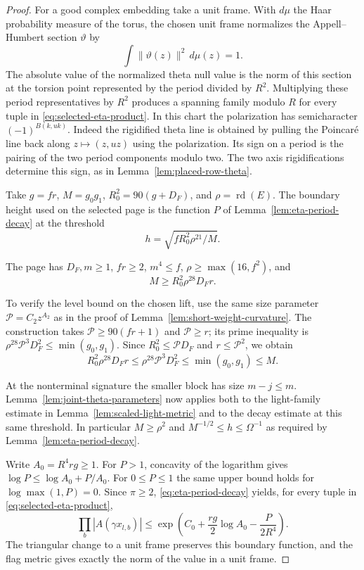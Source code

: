 \begin{proof}
For a good complex embedding take a unit frame. With \(d\mu\) the Haar probability measure of the torus, the chosen unit frame normalizes the Appell--Humbert section \(\vartheta\) by
\[
  \int\|\vartheta(z)\|^2\,d\mu(z)=1.
\]
The absolute value of the normalized theta null value is the norm
of this section at the torsion point represented by the period
divided by \(R^2\). Multiplying these period representatives
by \(R^2\) produces a spanning family modulo \(R\) for every
tuple in \eqref{eq:selected-eta-product}. In this chart the
polarization has semicharacter \((-1)^{B(k,uk)}\). Indeed the
rigidified theta line is obtained by pulling the Poincar\'e line
back along \(z\mapsto(z,uz)\) using the polarization. Its sign
on a period is the pairing of the two period components modulo two.
The two axis rigidifications determine this sign, as in
Lemma~\ref{lem:placed-row-theta}.

Take \(g=fr\), \(M=g_0g_1\), \(R_0^2=90(g+D_F)\), and
\(\rho=\operatorname{rd}(E)\). The boundary height used on the
selected page is the function \(P\) of Lemma~\ref{lem:eta-period-decay}
at the threshold
\[
 h=\sqrt{f R_0^2\rho^{21}/M}.
\]

The page has \(D_F,m\ge1\), \(fr\ge2\), \(m^4\le f\),
\(\rho\ge\max(16,f^2)\), and
\begin{equation}\label{eq:selected-torus-level}
 M\ge R_0^2\rho^{28} D_F r .
\end{equation}

To verify the level bound on the chosen lift, use the same size
parameter \(\mathcal P=C_2z^{A_2}\) as in the proof of
Lemma~\ref{lem:short-weight-curvature}. The construction takes
\(\mathcal P\ge90(fr+1)\) and \(\mathcal P\ge r\); its prime
inequality is \(\rho^{28}\mathcal P^3 D_F^2\le\min(g_0,g_1)\).
Since \(R_0^2\le\mathcal P D_F\) and \(r\le\mathcal P^2\), we obtain
\[
 R_0^2\rho^{28}D_F r\le\rho^{28}\mathcal P^3D_F^2
                    \le\min(g_0,g_1)\le M .
\]

At the nonterminal signature the smaller block has size
\(m-j\le m\). Lemma~\ref{lem:joint-theta-parameters} now applies
both to the light-family estimate in
Lemma~\ref{lem:scaled-light-metric} and to the decay estimate at
this same threshold. In particular \(M\ge\rho^2\) and
\(M^{-1/2}\le h\le\Omega^{-1}\) as required by
Lemma~\ref{lem:eta-period-decay}.
\label{cor:selected-auxiliary-cusp-5}

Write \(A_0=R^4rg\ge1\). For \(P>1\), concavity of the logarithm
gives \(\log P\le\log A_0+P/A_0\). For \(0\le P\le1\) the same upper
bound holds for \(\log\max(1,P)=0\). Since \(\pi\ge2\),
\eqref{eq:eta-period-decay} yields, for every tuple in
\eqref{eq:selected-eta-product},
\[
 \prod_b|A(\gamma x_{l,b})|
 \le\exp\!\left(C_0+\frac{rg}2\log A_0
                          -\frac{P}{2R^4}\right).
\]
The triangular change to a unit frame preserves this boundary
function, and the flag metric gives exactly the norm of
the value in a unit frame.


\end{proof}
